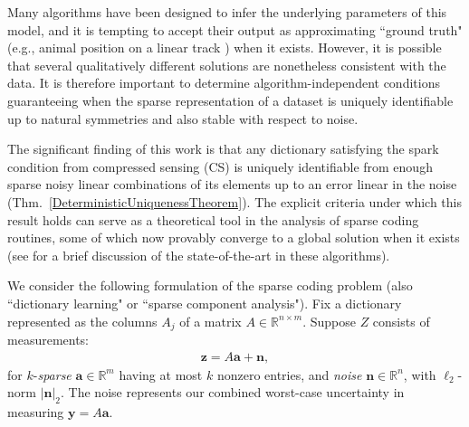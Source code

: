 \documentclass[journal, twocolumn]{IEEEtran}
\begin{document}
Many algorithms have been designed to infer the underlying parameters of this model, and it is tempting to accept their output as approximating ``ground truth" (e.g., animal position on a linear track \cite{Agarwal14}) when it exists. However, it is possible that several qualitatively different solutions are nonetheless consistent with the data. It is therefore important to determine algorithm-independent conditions guaranteeing when the sparse representation of a dataset is uniquely identifiable up to natural symmetries and also stable with respect to noise. 

The significant finding of this work is that any dictionary satisfying the spark condition from compressed sensing (CS) is uniquely identifiable from enough sparse noisy linear combinations of its elements up to an error linear in the noise (Thm.~\ref{DeterministicUniquenessTheorem}).
The explicit criteria under which this result holds can serve as a theoretical tool in the analysis of sparse coding routines, some of which now provably converge to a global solution when it exists (see \cite[Sec.~I-E]{Sun16} for a brief discussion of the state-of-the-art in these algorithms). 

We consider the following formulation of the sparse coding problem (also ``dictionary learning" or ``sparse component analysis"). Fix a dictionary represented as the columns $A_j$ of a matrix $A \in \mathbb R^{n \times m}$. Suppose  $Z$ consists of measurements:
\begin{align}\label{LinearModel}
\mathbf{z} = A\mathbf{a} + \mathbf{n},
\end{align}
for $k$-\emph{sparse} $\mathbf{a} \in \mathbb{R}^m$ having at most $k$ nonzero entries, and \emph{noise} $\mathbf{n} \in \mathbb{R}^n$, with $\ell_2$-norm $|\mathbf{n}|_2$. The noise represents our combined worst-case uncertainty in  measuring $\mathbf{y} = A\mathbf{a}$.
\end{document}
